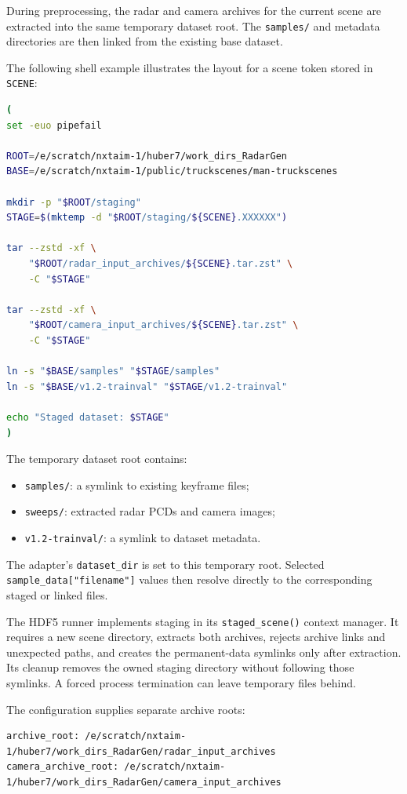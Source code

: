 \documentclass[11pt,a4paper]{article}
\begin{document}
During preprocessing, the radar and camera archives for the current
scene are extracted into the same temporary dataset root. The
\texttt{samples/} and metadata directories are then linked from the
existing base dataset.

The following shell example illustrates the layout for a scene token
stored in \texttt{SCENE}:
\begin{lstlisting}[language=bash]
(
set -euo pipefail

ROOT=/e/scratch/nxtaim-1/huber7/work_dirs_RadarGen
BASE=/e/scratch/nxtaim-1/public/truckscenes/man-truckscenes

mkdir -p "$ROOT/staging"
STAGE=$(mktemp -d "$ROOT/staging/${SCENE}.XXXXXX")

tar --zstd -xf \
    "$ROOT/radar_input_archives/${SCENE}.tar.zst" \
    -C "$STAGE"

tar --zstd -xf \
    "$ROOT/camera_input_archives/${SCENE}.tar.zst" \
    -C "$STAGE"

ln -s "$BASE/samples" "$STAGE/samples"
ln -s "$BASE/v1.2-trainval" "$STAGE/v1.2-trainval"

echo "Staged dataset: $STAGE"
)
\end{lstlisting}

The temporary dataset root contains:
\begin{itemize}
    \item \texttt{samples/}: a symlink to existing keyframe files;
    \item \texttt{sweeps/}: extracted radar PCDs and camera images;
    \item \texttt{v1.2-trainval/}: a symlink to dataset metadata.
\end{itemize}

The adapter's \texttt{dataset\_dir} is set to this temporary root.
Selected \texttt{sample\_data["filename"]} values then resolve
directly to the corresponding staged or linked files.

The HDF5 runner implements staging in its
\texttt{staged\_scene()} context manager. It requires a new scene
directory, extracts both archives, rejects archive links and
unexpected paths, and creates the permanent-data symlinks only after
extraction. Its cleanup removes the owned staging directory without
following those symlinks. A forced process termination can leave
temporary files behind.

The configuration supplies separate archive roots:
\begin{lstlisting}[language={}]
archive_root: /e/scratch/nxtaim-1/huber7/work_dirs_RadarGen/radar_input_archives
camera_archive_root: /e/scratch/nxtaim-1/huber7/work_dirs_RadarGen/camera_input_archives
\end{lstlisting}
\end{document}
